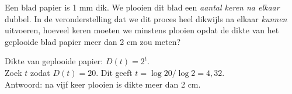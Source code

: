 %    
%
     
\begin{oef}
Een blad papier is 1 mm dik. We plooien dit blad een
\emph{aantal keren na elkaar} dubbel. In de veronderstelling dat
we dit proces heel dikwijls na elkaar \emph{kunnen} uitvoeren,
hoeveel keren moeten we minstens plooien opdat de dikte van
het geplooide blad papier meer dan 2 cm zou meten?
\begin{opl}
Dikte van geplooide papier: $D(t)=2^t$.\\
Zoek $t$ zodat $D(t)=20$. Dit geeft $t=\log20/\log 2=4,32$.\\
Antwoord: na vijf keer plooien is dikte meer dan 2 cm.
\end{opl}
\end{oef}

